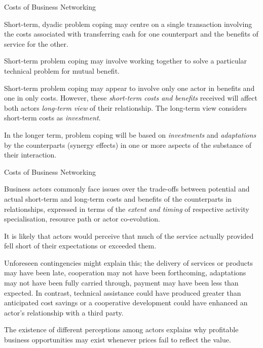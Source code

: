 \documentclass{beamer}
\begin{document}
\begin{frame}{Costs of Business Networking}

Short-term, dyadic problem coping may centre on a single transaction involving
the costs associated with transferring cash for one counterpart and the
beneﬁts of service for the other.

Short-term problem coping may involve working together to solve a particular
technical problem for mutual beneﬁt.

Short-term problem coping may appear to involve only one actor in beneﬁts and
one in only costs. However, these \emph{short-term costs and beneﬁts} received
will affect both actors \emph{long-term view} of their relationship.  The
long-term view considers short-term costs as \emph{investment}.

In the longer term, problem coping will be based on \emph{investments} and
\emph{adaptations} by the counterparts (synergy effects) in one or more
aspects of the substance of their interaction.

\end{frame}

\begin{frame}{Costs of Business Networking}\small

Business actors commonly face issues over the trade-offs between potential and
actual short-term and long-term costs and beneﬁts of the counterparts in
relationships, expressed in terms of the \emph{extent and timing} of
respective activity specialisation, resource path or actor co-evolution.

It is likely that actors would perceive that much of the service actually
provided fell short of their expectations or exceeded them.

Unforeseen contingencies might explain this; the delivery of services or
products may have been late, cooperation may not have been forthcoming,
adaptations may not have been fully carried through, payment may have been
less than expected. In contrast, technical assistance could have produced
greater than anticipated cost savings or a cooperative development could have
enhanced an actor's relationship with a third party.

The existence of different perceptions among actors explains why proﬁtable
business opportunities may exist whenever prices fail to reﬂect the value.
\end{frame}
  
  
\end{document}
